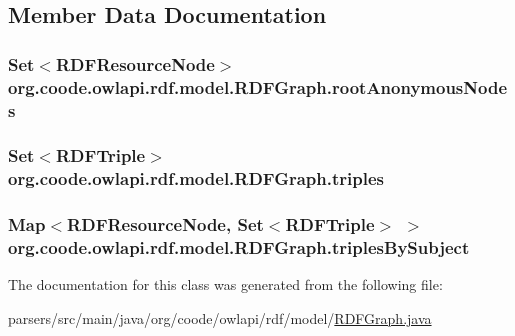 \subsection{Member Data Documentation}
\hypertarget{classorg_1_1coode_1_1owlapi_1_1rdf_1_1model_1_1_r_d_f_graph_afebf192f3ea9b68c2154cbf98547924b}{
\subsubsection[{root\-Anonymous\-Nodes}]{\setlength{\rightskip}{0pt plus 5cm}Set$<${\bf R\-D\-F\-Resource\-Node}$>$ org.\-coode.\-owlapi.\-rdf.\-model.\-R\-D\-F\-Graph.\-root\-Anonymous\-Nodes\hspace{0.3cm}{\ttfamily [private]}}}\label{classorg_1_1coode_1_1owlapi_1_1rdf_1_1model_1_1_r_d_f_graph_afebf192f3ea9b68c2154cbf98547924b}
\hypertarget{classorg_1_1coode_1_1owlapi_1_1rdf_1_1model_1_1_r_d_f_graph_ab1d1c7ed6b147763e8b2cd3b50b78459}{
\subsubsection[{triples}]{\setlength{\rightskip}{0pt plus 5cm}Set$<${\bf R\-D\-F\-Triple}$>$ org.\-coode.\-owlapi.\-rdf.\-model.\-R\-D\-F\-Graph.\-triples\hspace{0.3cm}{\ttfamily [private]}}}\label{classorg_1_1coode_1_1owlapi_1_1rdf_1_1model_1_1_r_d_f_graph_ab1d1c7ed6b147763e8b2cd3b50b78459}
\hypertarget{classorg_1_1coode_1_1owlapi_1_1rdf_1_1model_1_1_r_d_f_graph_a944a9001d484802a199abe0d0a6cb759}{
\subsubsection[{triples\-By\-Subject}]{\setlength{\rightskip}{0pt plus 5cm}Map$<${\bf R\-D\-F\-Resource\-Node}, Set$<${\bf R\-D\-F\-Triple}$>$ $>$ org.\-coode.\-owlapi.\-rdf.\-model.\-R\-D\-F\-Graph.\-triples\-By\-Subject\hspace{0.3cm}{\ttfamily [private]}}}\label{classorg_1_1coode_1_1owlapi_1_1rdf_1_1model_1_1_r_d_f_graph_a944a9001d484802a199abe0d0a6cb759}


The documentation for this class was generated from the following file\-:\begin{DoxyCompactItemize}
\item 
parsers/src/main/java/org/coode/owlapi/rdf/model/\hyperlink{_r_d_f_graph_8java}{R\-D\-F\-Graph.\-java}\end{DoxyCompactItemize}
